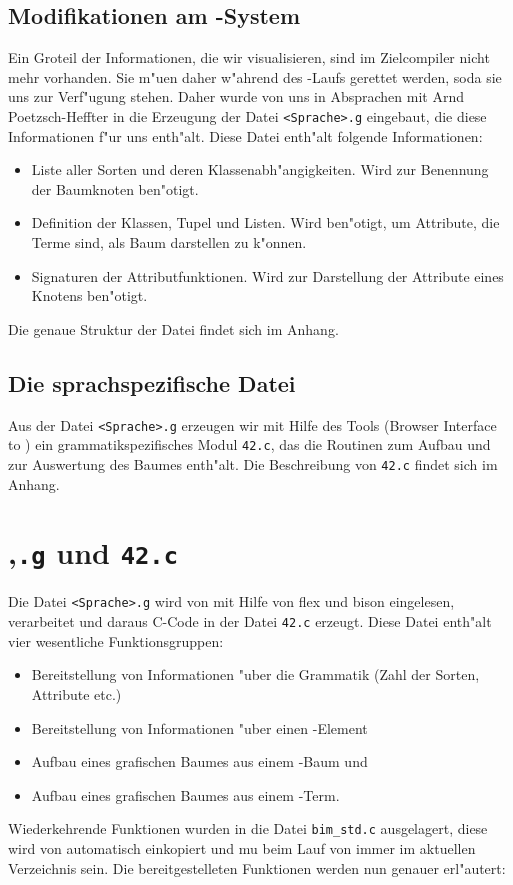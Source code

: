 \subsection{Modifikationen am \MAX-System}
Ein Gro\3teil der Informationen, die wir visualisieren, sind im Zielcompiler nicht
mehr vorhanden. Sie m"u\3en daher w"ahrend des \MAX-Laufs gerettet werden, soda\3
sie uns zur Verf"ugung stehen. Daher wurde von uns in Absprachen mit Arnd Poetzsch-Heffter
in \MAX die Erzeugung der Datei {\tt <Sprache>.g} eingebaut, die diese Informationen
f"ur uns enth"alt. Diese Datei enth"alt folgende Informationen:\\
\begin{itemize}
    \item Liste aller Sorten und deren Klassenabh"angigkeiten. Wird zur Benennung
	der Baumknoten ben"otigt.
    \item Definition der Klassen, Tupel und Listen. Wird ben"otigt, um Attribute, die
	Terme sind, als Baum darstellen zu k"onnen.
    \item Signaturen der Attributfunktionen. Wird zur Darstellung der Attribute eines
	Knotens ben"otigt.
\end{itemize}
Die genaue Struktur der Datei findet sich im Anhang.

\subsection{Die sprachspezifische Datei}
Aus der Datei {\tt <Sprache>.g} erzeugen wir mit Hilfe des Tools \BIM (Browser
Interface to \MAX) ein grammatikspezifisches Modul {\tt 42.c}, das die Routinen
zum Aufbau und zur Auswertung des Baumes enth"alt. Die Beschreibung von {\tt 42.c}
findet sich im Anhang.

\section{\BIM,{\tt .g} und {\tt 42.c}}
Die Datei {\tt <Sprache>.g} wird von \BIM mit Hilfe von flex und bison eingelesen,
verarbeitet und daraus C-Code in der Datei {\tt 42.c} erzeugt. Diese Datei enth"alt
vier wesentliche Funktionsgruppen:\\
\begin{itemize}
    \item Bereitstellung von Informationen "uber die Grammatik (Zahl der Sorten,
	Attribute etc.)
    \item Bereitstellung von Informationen "uber einen \MAX-Element
    \item Aufbau eines grafischen Baumes aus einem \MAX-Baum und
    \item Aufbau eines grafischen Baumes aus einem \MAX-Term.
\end{itemize}
Wiederkehrende Funktionen wurden in die Datei {\tt bim\_std.c} ausgelagert, diese
wird von \BIM automatisch einkopiert und mu\3 beim Lauf von \BIM immer im aktuellen
Verzeichnis sein. Die bereitgestelleten Funktionen werden nun genauer erl"autert:

